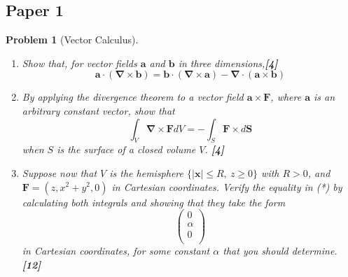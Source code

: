 \documentclass[a4paper]{article}
\theoremstyle{new}
\newtheorem{qns}{Problem}[section]
\begin{document}
\subsection{Paper 1}
\begin{qns}[Vector Calculus]\leavevmode
\begin{enumerate}[label=(\alph*)]
    \item Show that, for vector fields $\mathbf{a}$ and $\mathbf{b}$ in three dimensions,\hfill \textbf{[4]}
$$\mathbf{a}\cdot(\boldsymbol{\nabla}\times\mathbf{b})=\mathbf{b}\cdot(\boldsymbol{\nabla}\times\mathbf{a})-\boldsymbol{\nabla}\cdot(\mathbf{a}\times\mathbf{b})$$

\item  By applying the divergence theorem to a vector field $\mathbf{a}\times\mathbf{F}$, where $\mathbf{a}$ is an arbitrary constant vector, show that
\begin{equation}
    \int_V\boldsymbol{\nabla}\times\mathbf{F}dV=-\int_S\mathbf{F}\times d\mathbf{S}\tag{*}
\end{equation}
when $S$ is the surface of a closed volume $V$. \hfill \textbf{[4]}
\item Suppose now that $V$ is the hemisphere $\{|\mathbf{x}| \leq R, ~z \geq 0\}$ with $R > 0$, and $\mathbf{F} =(z, x^2 + y^2, 0)$ in Cartesian coordinates. Verify the equality in (*) by calculating both integrals and showing that they take the form
$$\begin{pmatrix}0\\\alpha\\0\\\end{pmatrix}$$
in Cartesian coordinates, for some constant $\alpha$ that you should determine. \hfill\textbf{[12]}
\end{enumerate}
\end{qns}
\end{document}
